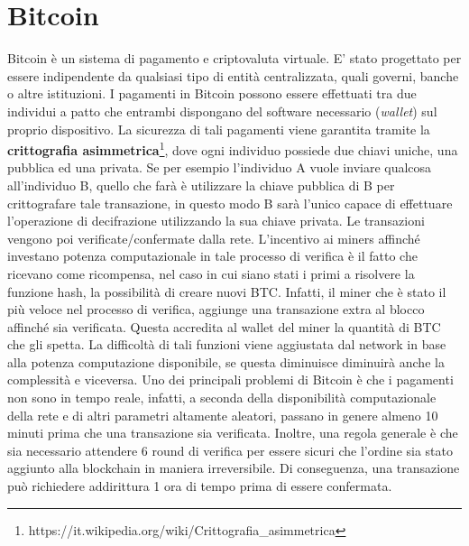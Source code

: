 \section{Bitcoin}
Bitcoin \cite{segendorf2014bitcoin,underwood2016blockchain} è un sistema di pagamento e criptovaluta virtuale. E' stato progettato per essere indipendente da qualsiasi tipo di entità centralizzata, quali governi, banche o altre istituzioni. I pagamenti in Bitcoin possono essere effettuati tra due individui a patto che entrambi dispongano del software necessario (\textit{wallet}) sul proprio dispositivo.
La sicurezza di tali pagamenti viene garantita tramite la \textbf{crittografia asimmetrica}\footnote{https://it.wikipedia.org/wiki/Crittografia\_asimmetrica}, dove ogni individuo possiede due chiavi uniche, una pubblica ed una privata. Se per esempio l'individuo A vuole inviare qualcosa all'individuo B, quello che farà è utilizzare la chiave pubblica di B per crittografare tale transazione, in questo modo B sarà l'unico capace di effettuare l'operazione di decifrazione utilizzando la sua chiave privata.
Le transazioni vengono poi verificate/confermate dalla rete. L'incentivo ai miners affinché investano potenza computazionale in tale processo di verifica è il fatto che ricevano come ricompensa, nel caso in cui siano stati i primi a risolvere la funzione hash, la possibilità di creare nuovi BTC. Infatti, il miner che è stato il più veloce nel processo di verifica, aggiunge una transazione extra al blocco affinché sia verificata. Questa accredita al wallet del miner la quantità di BTC che gli spetta. La difficoltà di tali funzioni viene aggiustata dal network in base alla potenza computazione disponibile, se questa diminuisce diminuirà anche la complessità e viceversa.
Uno dei principali problemi di Bitcoin è che i pagamenti non sono in tempo reale, infatti, a seconda della disponibilità computazionale della rete e di altri parametri altamente aleatori, passano in genere almeno 10 minuti prima che una transazione sia verificata. Inoltre, una regola generale è che sia necessario attendere 6 round di verifica per essere sicuri che l'ordine sia stato aggiunto alla blockchain in maniera irreversibile. Di conseguenza, una transazione può richiedere addirittura 1 ora di tempo prima di essere confermata.

